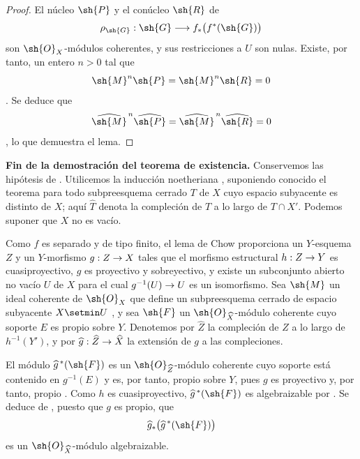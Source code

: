 \documentclass[oneside]{amsart}
\makeatletter
\newcommand{\ega@arrow}[2]{\mathchoice{#1}{#2}{#2}{#2}}
\renewcommand{\to}{\ega@arrow{\longrightarrow}{\rightarrow}}
\newcommand{\oldpage}[2][]{{\marginnote{\normalfont\textbf{#1}~|~#2}}\ignorespaces}
\let\EGAOriginalLabel\label
\renewcommand{\label}[1]{\phantomsection\EGAOriginalLabel{#1}}
\makeatother
\begin{document}
\begin{proof}
El núcleo $\sh{P}$ y el conúcleo $\sh{R}$ de
\[
  \rho_{\sh{G}}:
  \sh{G}\longrightarrow f_*\bigl(f^*(\sh{G})\bigr)
\]
son $\sh{O}_X$-módulos coherentes, y sus restricciones a $U$ son
nulas. Existe, por tanto, un entero $n>0$ tal que
\[
  \sh{M}^n\sh{P}=\sh{M}^n\sh{R}=0
\]
. Se deduce que
\[
  \widehat{\sh{M}}^{\,n}\widehat{\sh{P}}
  =
  \widehat{\sh{M}}^{\,n}\widehat{\sh{R}}
  =0
\]
 , lo que demuestra el lema.
\end{proof}

\begin{env}[5.3.5]
\label{III.5.3.5}
\textbf{Fin de la demostración del teorema de existencia.}
Conservemos las hipótesis de . Utilicemos la inducción
noetheriana , suponiendo conocido el teorema para todo
subpreesquema cerrado $T$ de $X$ cuyo espacio subyacente es distinto
de $X$; aquí $\widehat{T}$ denota la compleción de $T$ a lo largo de
$T\cap X'$. Podemos suponer que $X$ no es vacío.

Como $f$ es separado y de tipo finito, el lema de Chow
 proporciona un $Y$-esquema $Z$ y un $Y$-morfismo
$g:Z\to X$ tales que el morfismo estructural $h:Z\to Y$ es
cuasiproyectivo, $g$ es proyectivo y sobreyectivo, y existe un
subconjunto abierto no vacío $U$ de $X$ para el cual
$g^{-1}(U)\to U$ es un isomorfismo. Sea $\sh{M}$ un ideal coherente
de $\sh{O}_X$ que define un subpreesquema cerrado de espacio subyacente
$X\setmin U$ , y sea $\sh{F}$ un
$\sh{O}_{\widehat{X}}$-módulo coherente cuyo soporte $E$ es propio sobre $Y$.
Denotemos por $\widehat{Z}$ la compleción de $Z$ a lo largo de
$h^{-1}(Y')$, y por
$\widehat{g}:\widehat{Z}\to\widehat{X}$ la extensión de $g$ a
las compleciones.

El módulo $\widehat{g}^{\,*}(\sh{F})$ es un
$\sh{O}_{\widehat{Z}}$-módulo coherente cuyo soporte está contenido en
$g^{-1}(E)$ y es, por tanto, propio sobre $Y$, pues $g$ es
proyectivo y, por tanto, propio . Como $h$ es
cuasiproyectivo, $\widehat{g}^{\,*}(\sh{F})$ es algebraizable por
.
\oldpage[III]{156}
Se deduce de , puesto que $g$ es propio, que
\[
  \widehat{g}_*
  \bigl(\widehat{g}^{\,*}(\sh{F})\bigr)
\]
es un $\sh{O}_{\widehat{X}}$-módulo algebraizable.


\end{env}
\end{document}
